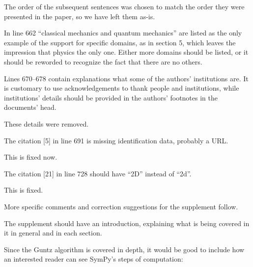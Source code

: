 \documentclass[answers,12pt]{exam}
\begin{document}
\begin{questions}
\begin{solution}
The order of the subsequent sentences was chosen to match the order they were
presented in the paper, so we have left them as-is.
\end{solution}

\question In line 662 ``classical mechanics and quantum mechanics'' are listed as the only example of the support for specific domains, as in section 5, which leaves the impression that physics the only one. Either more domains should be listed, or it should be reworded to recognize the fact that there are no others.
\begin{solution}

\end{solution}

\question Lines 670--678 contain explanations what some of the authors' institutions are. It is customary to use acknowledgements to thank people and institutions, while institutions' details should be provided in the authors' footnotes in the documents' head.
\begin{solution}
These details were removed.
\end{solution}

\question The citation [5] in line 691 is missing identification data, probably a URL\@.
\begin{solution}
This is fixed now.
\end{solution}

\question The citation [21] in line 728 should have ``2D'' instead of ``2d''.
\begin{solution}
This is fixed.
\end{solution}

More specific comments and correction suggestions for the supplement follow.

\question The supplement should have an introduction, explaining what is being covered in it in general and in each section.
\begin{solution}

\end{solution}

\question Since the Guntz algorithm is covered in depth, it would be good to
include how an interested reader can see SymPy's steps of computation:


\end{questions}
\end{document}
